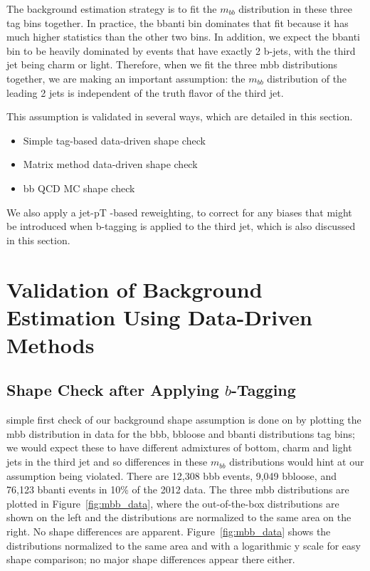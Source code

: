  The background estimation strategy is to fit the $m_{bb}$ distribution in these three tag bins together. In
 practice, the bbanti bin dominates that fit because it has much higher statistics than the other two bins. In
 addition, we expect the bbanti bin to be heavily dominated by events that have exactly 2 b-jets, with the
 third jet being charm or light. Therefore, when we fit the three mbb distributions together, we are making
 an important assumption: the $m_{bb}$ distribution of the leading 2 jets is independent of the truth flavor of the third jet.

This assumption is validated in several ways, which are detailed in this section.
\begin{itemize}
    \item Simple tag-based data-driven shape check
    \item Matrix method data-driven shape check
    \item bb QCD MC shape check
\end{itemize}
 We also apply a jet-pT -based reweighting, to correct for any biases that might be introduced when
 b-tagging is applied to the third jet, which is also discussed in this section.


\section{Validation of Background Estimation Using Data-Driven Methods}
\subsection{Shape Check after Applying $b$-Tagging}
 simple first check of our background shape assumption is done on by plotting the mbb distribution
 in data for the bbb, bbloose and bbanti distributions tag bins; we would expect these to have different
 admixtures of bottom, charm and light jets in the third jet and so differences in these $m_{bb}$ distributions
 would hint at our assumption being violated. There are 12,308 bbb events, 9,049 bbloose, and 76,123
 bbanti events in 10\% of the 2012 data. The three mbb distributions are plotted in Figure~\ref{fig:mbb_data}, where the
 out-of-the-box distributions are shown on the left and the distributions are normalized to the same area
 on the right. No shape differences are apparent. Figure~\ref{fig:mbb_data} shows the distributions normalized to the
 same area and with a logarithmic y scale for easy shape comparison; no major shape differences appear
 there either.

